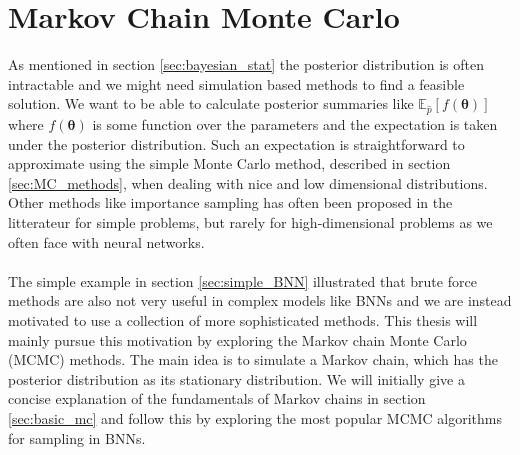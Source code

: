 \section{Markov Chain Monte Carlo}\label{sec:MCMC}
 As mentioned in section \ref{sec:bayesian_stat} the posterior distribution is often intractable and we might need simulation based methods to find a feasible solution. We want to be able to calculate posterior summaries like $\mathbb{E}_{\hat{p}}\left[f(\boldsymbol{\theta})\right]$ where $f(\boldsymbol{\theta})$ is some function over the parameters and the expectation is taken under the posterior distribution. Such an expectation is straightforward to approximate using the simple Monte Carlo method, described in section \ref{sec:MC_methods}, when dealing with nice and low dimensional distributions. Other methods like importance sampling has often been proposed in the litterateur for simple problems, but rarely for high-dimensional problems as we often face with neural networks.
 \\
 \\
The simple example in section \ref{sec:simple_BNN} illustrated that brute force methods are also not very useful in complex models like BNNs and we are instead motivated to use a collection of more sophisticated methods. This thesis will mainly pursue this motivation by exploring the Markov chain Monte Carlo (MCMC) methods. The main idea is to simulate a Markov chain, which has the posterior distribution as its stationary distribution. We will initially give a concise explanation of the fundamentals of Markov chains in section \ref{sec:basic_mc} and follow this by exploring the most popular MCMC algorithms for sampling in BNNs.
 
 
